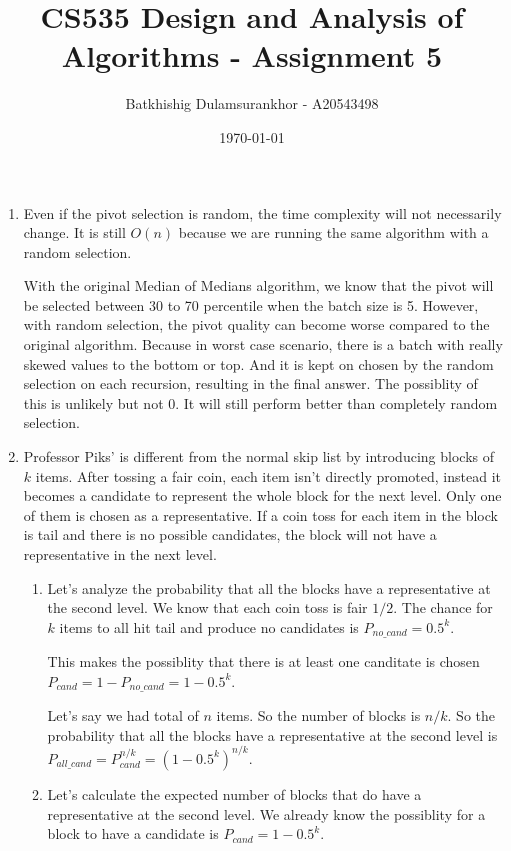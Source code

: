 \documentclass{article}
\title{CS535 Design and Analysis of Algorithms - Assignment 5}
\author{Batkhishig Dulamsurankhor - A20543498}
\date{\today} %
\begin{document}
\maketitle

\begin{enumerate}
  \item Even if the pivot selection is random, the time complexity will not necessarily change.
  It is still $O(n)$ because we are running the same algorithm with a random selection.

  With the original Median of Medians algorithm, we know that the pivot will be selected between 30 to 70 percentile when the batch size is 5.
  However, with random selection, the pivot quality can become worse compared to the original algorithm.
  Because in worst case scenario, there is a batch with really skewed values to the bottom or top.
  And it is kept on chosen by the random selection on each recursion, resulting in the final answer.
  The possiblity of this is unlikely but not 0.
  It will still perform better than completely random selection.

  \item Professor Piks' is different from the normal skip list by introducing blocks of $k$ items.
  After tossing a fair coin, each item isn't directly promoted, instead it becomes a candidate to represent the whole block for the next level.
  Only one of them is chosen as a representative.
  If a coin toss for each item in the block is tail and there is no possible candidates, the block will not have a representative in the next level.

  \begin{enumerate}
    \item Let's analyze the probability that all the blocks have a representative at the second level.
    We know that each coin toss is fair $1/2$.
    The chance for $k$ items to all hit tail and produce no candidates is $P_{no\_cand}=0.5^k$.
  
    This makes the possiblity that there is at least one canditate is chosen $P_{cand}=1-P_{no\_cand}=1-0.5^k$.
  
    Let's say we had total of $n$ items. So the number of blocks is $n/k$.
    So the probability that all the blocks have a representative at the second level is $P_{all\_cand}=P_{cand}^{n/k}=(1-0.5^k)^{n/k}$.

    \item Let's calculate the expected number of blocks that do have a representative at the second level.
    We already know the possiblity for a block to have a candidate is $P_{cand}=1-0.5^k$.


\end{enumerate}
\end{enumerate}
\end{document}

